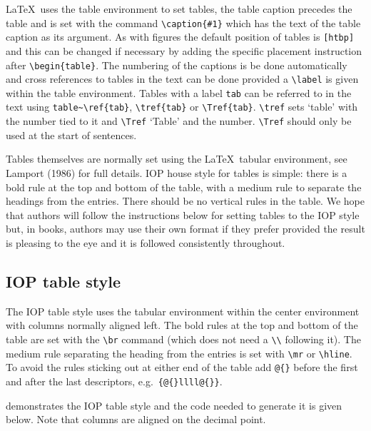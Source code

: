 \LaTeX\ uses the table environment 
to set tables, the table caption precedes the table 
and is set 
with the command \verb"\caption{#1}"
which has the text of the table caption as its argument. 
As with figures the default position of tables is \verb"[htbp]"
and this can be changed if necessary by adding the specific placement
instruction after \verb"\begin{table}".
The 
numbering of the captions is be done automatically and cross
references to 
tables in the text can be done provided a \verb"\label" is given within the
table environment. Tables with a label \verb"tab" can be referred to in the
text using \verb"table~\ref{tab}", \verb"\tref{tab}" or \verb"\Tref{tab}". \verb"\tref" sets
`table' with the number tied to it and \verb"\Tref" `Table' and the number.
\verb"\Tref" should only be used at the start of sentences.

Tables themselves are normally set using the \LaTeX\ tabular environment,
see Lamport (1986) for full details.
IOP house style for tables is simple: there is 
a bold rule at the top and bottom of the table, with a medium rule to 
separate the headings from the entries. There should be no vertical 
rules in the table. 
We hope that authors will follow the instructions below for setting 
tables to the IOP style but, in books, authors may use their own format
if they prefer provided the result is pleasing to the eye and
it is followed consistently throughout.

\subsection{IOP table style}
The IOP table style uses the tabular environment within the center
environment
with columns normally aligned left.
The bold rules at the top and bottom of the table are 
set with the \verb"\br" command 
(which does not need a \verb"\\" following it).
The medium rule separating the heading from the entries 
is set with \verb"\mr"
or \verb"\hline". To avoid the rules sticking out at either end of the
table add \verb"@{}" before the first and after the last descriptors,
e.g.\ \verb"{@{}llll@{}}".
 
 demonstrates the IOP table style and the code needed to
generate it is given below. Note that columns are aligned on the decimal
point.

